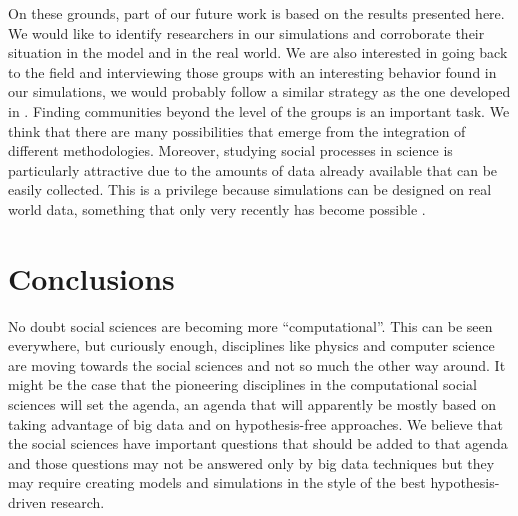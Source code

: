 \documentclass{bmcart}
\begin{document}
  On these grounds, part of our future work is based on the results
  presented here. We would like to identify researchers in our
  simulations and corroborate their situation in the model and in the
  real world. We are also interested in going back to the field and
  interviewing those groups with an interesting behavior found in our
  simulations, we would probably follow a similar strategy as the one
  developed in \cite{Hara:2003}. Finding communities beyond the level
  of the groups is an important task. We think that there are many
  possibilities that emerge from the integration of different
  methodologies. Moreover, studying social processes in science is
  particularly attractive due to the amounts of data already available
  that can be easily collected. This is a privilege because
  simulations can be designed on real world data, something that only
  very recently has become possible \cite{Barabasi:2012}.\\

\section*{Conclusions}

No doubt social sciences are becoming more ``computational''. This can
be seen everywhere, but curiously enough, disciplines like physics
and computer science are moving towards the social
sciences and not so much the other way around. It might be the case
that the pioneering disciplines in the computational social sciences
will set the agenda, an agenda that will apparently be mostly based on
taking advantage of big data and on hypothesis-free approaches. We
believe that the social sciences have important questions that should
be added to that agenda and those questions may not be answered only
by big data techniques but they may require creating models and
simulations in the style of the best hypothesis-driven research.

\end{document}

